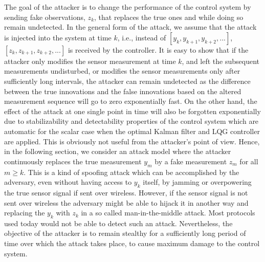 \documentclass[journal,10pt]{IEEEtran}
\begin{document}
The goal of the attacker is to change the performance of the control
system by sending fake observations, $z_{k}$, that replaces the true ones and while doing so
remain undetected. In the
general form of the attack, we assume that the attack is injected into the system at
time $k$, i.e., instead of $[y_{k}, y_{k+1}, y_{k+2},... ]$,
$[z_{k}, z_{k+1}, z_{k+2},... ]$ is received by the controller.
It is easy to show that if the attacker only modifies the sensor measurement at time $k$, and left the subsequent measurements undisturbed, or modifies the sensor measurements only after sufficiently long  intervals, the attacker can remain undetected as the difference between the true innovations and the false innovations based on the altered measurement sequence will go to zero exponentially fast. On the other hand, the effect of the attack at one single point in time will also be forgotten exponentially due to stabilizability and detectability properties of the control system which are automatic for the scalar case when the optimal Kalman filter and LQG controller are applied. This is obviously not useful from the attacker's point of view. Hence, in the following section, we consider an attack model where the attacker continuously replaces the true measurement $y_m$ by a fake measurement $z_m$ for all $m \geq k$. {\black This is a kind of spoofing attack which can be accomplished by the adversary, even without having access to $y_k$ itself, by jamming or overpowering the true sensor signal if sent over wireless. However, if the sensor signal is not sent over wireless the adversary might be able to hijack it in another way and replacing the $y_k$ with $z_k$ in a so called man-in-the-middle attack. Most protocols used today would not be able to detect such an attack. Nevertheless, the objective of the attacker is to remain stealthy for a sufficiently long period of time over which the attack takes place, to cause maximum damage to the control system.}
\end{document}
